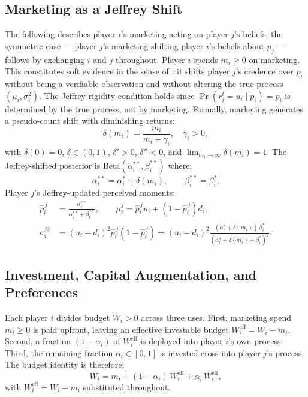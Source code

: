 \documentclass[12pt,a4paper]{article}
\newcommand{\hatpij}{\hat{p}_i^{\,j}}
\newcommand{\1}{\mathbf{1}}
\begin{document}
\subsection{Marketing as a Jeffrey Shift}

The following describes player $i$'s marketing acting on player $j$'s 
beliefs; the symmetric case --- player $j$'s marketing shifting player 
$i$'s beliefs about $p_j$ --- follows by exchanging $i$ and $j$ 
throughout. Player $i$ spends $m_i \geq 0$ on marketing. This constitutes soft
evidence in the sense of \citet{Jeffrey1965}: it shifts player $j$'s
credence over $p_i$ without being a verifiable observation and without
altering the true process $(\mu_i, \sigma_i^2)$. The Jeffrey rigidity
condition holds since $\Pr(r_i^t = u_i \mid p_i) = p_i$ is determined
by the true process, not by marketing. Formally, marketing generates a
pseudo-count shift with diminishing returns:
\begin{equation}
  \delta(m_i) = \frac{m_i}{m_i + \gamma_i}, \quad \gamma_i > 0,
  \label{eq:delta}
\end{equation}
with $\delta(0)=0$, $\delta \in (0,1)$, $\delta'> 0$,
$\delta'' < 0$, and $\lim_{m_i\to\infty}\delta(m_i) = 1$.
The Jeffrey-shifted posterior is
$\mathrm{Beta}(\alpha_i^{**}, \beta_i^{**})$ where:
\begin{equation}
  \alpha_i^{**} = \alpha_i^* + \delta(m_i), \qquad
  \beta_i^{**} = \beta_i^*.
  \label{eq:jeffrey_shift}
\end{equation}
Player $j$'s Jeffrey-updated perceived moments:
\begin{align}
  \hatpij &= \frac{\alpha_i^{**}}{\alpha_i^{**}+\beta_i^{**}}, \qquad
  \mu_i^j = \hatpij u_i + (1-\hatpij)d_i,
  \label{eq:perceived_drift}\\
  \sigma_i^{j2} &= (u_i-d_i)^2\hatpij(1-\hatpij)
  = (u_i-d_i)^2
    \frac{(\alpha_i^*+\delta(m_i))\,\beta_i^*}{(\alpha_i^*+\delta(m_i)+\beta_i^*)^2}.
  \label{eq:perceived_vol}
\end{align}

\subsection{Investment, Capital Augmentation, and Preferences}

Each player $i$ divides budget $W_i > 0$ across three uses. First,
marketing spend $m_i \geq 0$ is paid upfront, leaving an effective
investable budget $W_i^{\mathrm{eff}} = W_i - m_i$. Second, a
fraction $(1 - \alpha_i)$ of $W_i^{\mathrm{eff}}$ is deployed into
player $i$'s own process. Third, the remaining fraction
$\alpha_i \in [0,1]$ is invested cross into player $j$'s process.
The budget identity is therefore:
\begin{equation}
  W_i = m_i
        + (1-\alpha_i)\,W_i^{\mathrm{eff}}
        + \alpha_i\,W_i^{\mathrm{eff}},
  \label{eq:budget}
\end{equation}
with $W_i^{\mathrm{eff}} = W_i - m_i$ substituted throughout.
\end{document}
